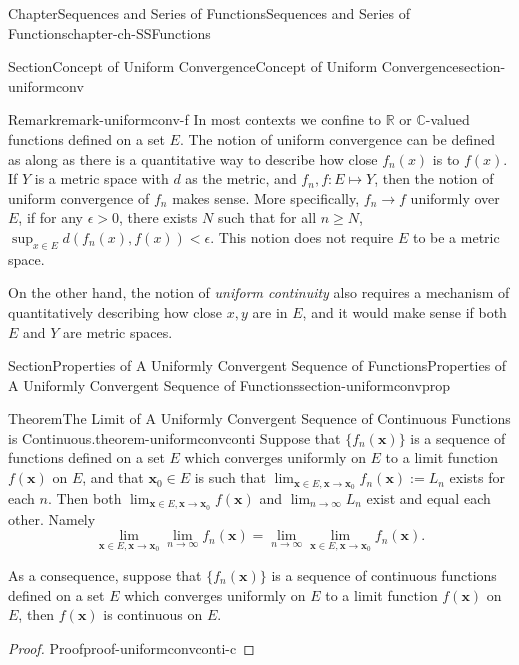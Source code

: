 \documentclass[oneside,10pt,]{book}
\numberwithin{equation}{section}
\newcommand{\bx}{\mathbf{x}}
\begin{document}
\begin{chapterptx}{Chapter}{Sequences and Series of Functions}{}{Sequences and Series of Functions}{}{}{chapter-ch-SSFunctions}
\begin{sectionptx}{Section}{Concept of Uniform Convergence}{}{Concept of Uniform Convergence}{}{}{section-uniformconv}
\begin{remark}{Remark}{}{remark-uniformconv-f}
In most contexts we confine to \(\mathbb R\) or \(\mathbb C\)-valued functions defined on a set \(E\). The notion of uniform convergence can be defined as along as there is a quantitative way to describe how close \(f_{n}(x)\) is to \(f(x)\). If \(Y\) is a metric space with \(d\) as the metric, and \(f_{n}, f: E \mapsto Y\), then the notion of uniform convergence of \(f_{n}\) makes sense. More specifically, \(f_{n}\to f\) uniformly over \(E\), if for any \(\epsilon > 0\), there exists \(N\) such that for all \(n\ge N\), \(\sup_{x\in E}d(f_{n}(x), f(x)) < \epsilon\). This notion does not require \(E\) to be a metric space.%
\par
On the other hand, the notion of \emph{uniform continuity} also requires	a mechanism of quantitatively describing how close \(x, y\) are in \(E\), and it would make sense if both \(E\) and \(Y\) are  metric spaces.%
\end{remark}
\end{sectionptx}
%
%
\typeout{************************************************}
\typeout{************************************************}
%
\begin{sectionptx}{Section}{Properties of A Uniformly Convergent Sequence of Functions}{}{Properties of A Uniformly Convergent Sequence of Functions}{}{}{section-uniformconvprop}
\begin{theorem}{Theorem}{The Limit of A Uniformly Convergent Sequence of Continuous Functions is Continuous.}{}{theorem-uniformconvconti}%
Suppose that \(\{f_n(\bx)\}\) is a sequence of functions defined on a set \(E\) which converges uniformly on \(E\) to a limit function \(f(\bx)\) on \(E\), and that \(\bx_0\in E\) is such that \(\lim_{\bx\in E, \bx \to \bx_0} f_n(\bx) :=L_n\) exists for each \(n\). Then both \(\lim_{\bx\in E, \bx \to \bx_0} f(\bx)\) and \(\lim_{n\to \infty}L_n\) exist and equal each other. Namely%
\begin{equation*}
\lim_{\bx\in E, \bx \to \bx_0} \lim_{n\to \infty}  f_n(\bx)=\lim_{n\to \infty} \lim_{\bx\in E, \bx \to \bx_0} f_n(\bx)\text{.}
\end{equation*}
%
\par
As a consequence, suppose that \(\{f_n(\bx)\}\) is a sequence of continuous functions defined on a set \(E\) which converges uniformly on \(E\) to a limit function \(f(\bx)\) on \(E\), then \(f(\bx)\) is continuous on \(E\).%
\end{theorem}
\begin{proof}{Proof}{}{proof-uniformconvconti-c}

\end{proof}
\end{sectionptx}
\end{chapterptx}
\end{document}
